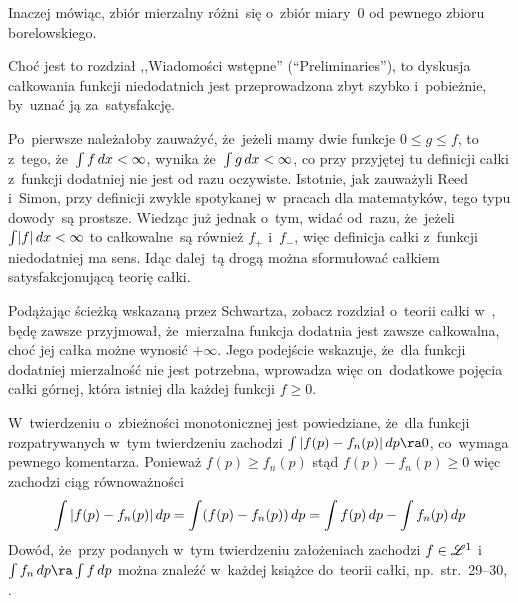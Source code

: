 \documentclass[a4paper,11pt]{article}
\begin{document}
Inaczej mówiąc, zbiór mierzalny różni~się o~zbiór miary~0 od pewnego
zbioru borelowskiego. %

\vspace{\spaceFour}



\start {} Choć jest to rozdział ,,Wiadomości wstępne''
(``Preliminaries''), to dyskusja całkowania funkcji niedodatnich jest
przeprowadzona zbyt szybko i~pobieżnie, by~uznać ją za~satysfakcję.

Po~pierwsze należałoby zauważyć, że~jeżeli mamy dwie funkcje
$0 \leq g \leq f$, to z~tego, że~$\int\limits  f  \, d x  < \infty$, wynika
że~$\int\limits  g  \, d x  < \infty$, co przy przyjętej tu definicji całki
z~funkcji dodatniej nie jest od razu oczywiste. Istotnie, jak
zauważyli Reed i~Simon, przy definicji zwykle spotykanej w~pracach dla
matematyków, tego typu dowody~są prostsze. Wiedząc już jednak o~tym,
widać od~razu, że~jeżeli $\int\limits  \lvert  f  \rvert  \, d x  < \infty$ to
całkowalne~są również $f_{ + }$ i~$f_{ - }$, więc definicja całki
z~funkcji niedodatniej ma sens. Idąc dalej~tą drogą można sformułować
całkiem satysfakcjonującą teorię całki.

Podążając ścieżką wskazaną przez Schwartza, zobacz rozdział o~teorii
całki w~\cite{SchwartzKursAnalizyMatematycznej79}, będę zawsze
przyjmował, że~mierzalna funkcja dodatnia jest zawsze całkowalna, choć
jej całka możne wynosić $+\infty$. Jego podejście wskazuje, że~dla
funkcji dodatniej mierzalność nie jest potrzebna, wprowadza więc
on~dodatkowe pojęcia całki górnej, która istniej dla każdej funkcji
$f \geq 0$. %


\vspace{\spaceFour}



\start {} W~twierdzeniu o~zbieżności monotonicznej jest
powiedziane, że~dla funkcji rozpatrywanych w~tym twierdzeniu zachodzi
$\int | f( p ) - f_{ n }( p ) | \dk p \ra 0$, co~wymaga pewnego
komentarza. Ponieważ $f( p ) \geq f_{ n }( p )$ stąd
$f( p ) - f_{ n }( p ) \geq 0$ więc zachodzi ciąg równoważności
\begin{equation*}
  \int\limits  | f( p ) - f_{ n }( p ) |  \, d p  = \int\limits  ( f( p )
    - f_{ n }( p ) )  \, d p  = \int\limits  f( p )  \, d p 
  - \int\limits  f_{ n }( p )  \, d p 
\end{equation*}
Dowód, że~przy podanych w~tym twierdzeniu założeniach zachodzi
$f \in \mathcal{L}^{ 1 }$ i~$\IntCaD{ f_{ n } }{ p } \ra \IntCaD{ f }{ p }$ można
znaleźć w~każdej książce do~teorii całki, np.~str.~29--30,
\cite{Rudin98}. %
\end{document}
